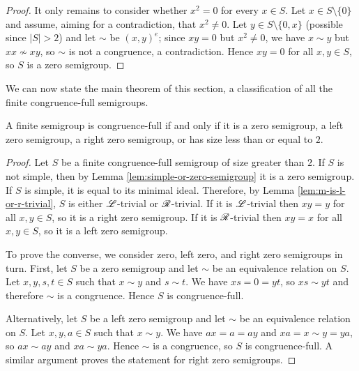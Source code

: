 \begin{lemma}
\begin{proof}
    It only remains to consider whether $x^2=0$ for every $x \in S$.  Let
    $x \in S \setminus \{0\}$ and assume, aiming for a contradiction, that
    $x^2 \neq 0$.  Let $y \in S \setminus \{0,x\}$ (possible since $|S| > 2$)
    and let $\sim$ be $(x,y)^e$; since $xy=0$ but $x^2 \neq 0$, we have
    $x \sim y$ but $xx \nsim xy$, so $\sim$ is not a congruence, a
    contradiction.  Hence $xy = 0$ for all $x,y \in S$, so $S$ is a zero
    semigroup.
  \end{proof}
\end{lemma}

We can now state the main theorem of this section, a classification of all the
finite congruence-full semigroups.

\begin{theorem}
  \label{thm:congruence-full}
  A finite semigroup is congruence-full if and only if it is a zero semigroup, a
  left zero semigroup, a right zero semigroup, or has size less than or equal to
  $2$.
  \begin{proof}
    Let $S$ be a finite congruence-full semigroup of size greater than $2$.  If
    $S$ is not simple, then by Lemma \ref{lem:simple-or-zero-semigroup} it is a
    zero semigroup.  If $S$ is simple, it is equal to its minimal ideal.
    Therefore, by Lemma \ref{lem:m-is-l-or-r-trivial}, $S$ is either
    $\mathrel{\mathscr{L}}$-trivial or $\mathrel{\mathscr{R}}$-trivial.  If it is $\mathrel{\mathscr{L}}$-trivial then $xy=y$ for all
    $x,y \in S$, so it is a right zero semigroup.  If it is $\mathrel{\mathscr{R}}$-trivial then
    $xy=x$ for all $x,y \in S$, so it is a left zero semigroup.

    To prove the converse, we consider zero, left zero, and right zero
    semigroups in turn.  First, let $S$ be a zero semigroup and let $\sim$ be an
    equivalence relation on $S$.  Let $x,y,s,t \in S$ such that $x \sim y$ and
    $s \sim t$.  We have $xs = 0 = yt$, so $xs \sim yt$ and therefore $\sim$ is
    a congruence.  Hence $S$ is congruence-full.

    Alternatively, let $S$ be a left zero semigroup and let $\sim$ be an
    equivalence relation on $S$.  Let $x,y,a \in S$ such that $x \sim y$.  We
    have $ax = a = ay$ and $xa = x \sim y = ya$, so $ax \sim ay$ and
    $xa \sim ya$.  Hence $\sim$ is a congruence, so $S$ is congruence-full.
    A similar argument proves the statement for right zero semigroups.

  \end{proof}
\end{theorem}



